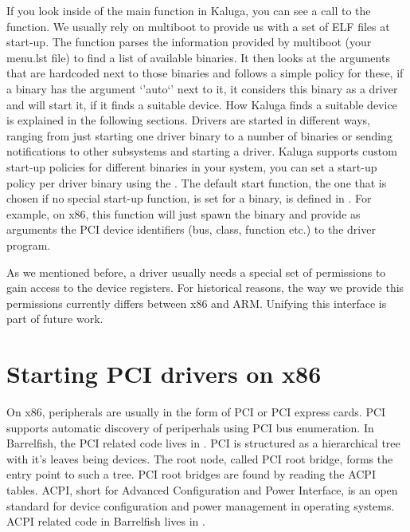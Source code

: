 \documentclass[a4paper,11pt,twoside]{report}
\begin{document}
If you look inside of the main function in Kaluga, you can see a call to the
 function. We usually rely on multiboot to provide
us with a set of ELF files at start-up. The 
function parses the information provided by multiboot (your menu.lst file)  to
find a list of available binaries. It then looks at the arguments that are
hardcoded next to those binaries and follows a simple policy for these, if a
binary has the argument `'auto`' next to it, it considers this binary as a
driver and will start it, if it finds a suitable device. How Kaluga finds a
suitable device is explained in the following sections. Drivers are started in
different ways, ranging from just starting one driver binary to a number of
binaries or sending notifications to other subsystems and starting a driver.
Kaluga supports custom start-up policies for different binaries in your
system, you can set a start-up policy per driver binary using the
. The default start function, the one that is
chosen if no special start-up function, is set for a binary, is defined in
. For example, on x86, this function
will just spawn the binary and provide as arguments the PCI device identifiers
(bus, class, function etc.) to the driver program.

As we mentioned before, a driver usually needs a special set of permissions to
gain access to the device registers. For historical reasons, the way we
provide this permissions currently differs between x86 and ARM. Unifying this
interface is part of future work.

\section{Starting PCI drivers on x86}
\label{sec:pcidriverstart}

On x86, peripherals are usually in the form of PCI or PCI express cards. PCI
supports automatic discovery of periperhals using PCI bus enumeration. In
Barrelfish, the PCI related code lives in . PCI is
structured as a hierarchical tree with it's leaves being devices. The root
node, called PCI root bridge, forms the entry point to such a tree. PCI root
bridges are found by reading the ACPI tables. ACPI, short for Advanced
Configuration and Power Interface, is an open standard for device
configuration and power management in operating systems. ACPI related code in
Barrelfish lives in .
\end{document}
